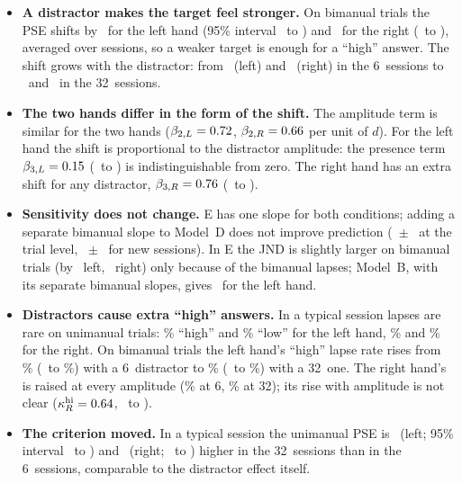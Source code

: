 \begin{itemize}
\item \textbf{A distractor makes the target feel stronger.} On bimanual trials the PSE shifts by \cnEShiftLeft\um\ for the left hand (95\% interval \cnEShiftLeftLo\ to \cnEShiftLeftHi) and \cnEShiftRight\um\ for the right (\cnEShiftRightLo\ to \cnEShiftRightHi), averaged over sessions, so a weaker target is enough for a ``high'' answer.
The shift grows with the distractor: from \cnEShiftSixLeft\ (left) and \cnEShiftSixRight\um\ (right) in the 6\um\ sessions to \cnEShiftThirtytwoLeft\ and \cnEShiftThirtytwoRight\um\ in the 32\um\ sessions.
\item \textbf{The two hands differ in the form of the shift.} The amplitude term is similar for the two hands ($\beta_{2,L}=0.72$, $\beta_{2,R}=0.66$ per unit of $d$).
For the left hand the shift is proportional to the distractor amplitude: the presence term $\beta_{3,L}=0.15$ (\cnEbthreeLeftLo\ to \cnEbthreeLeftHi) is indistinguishable from zero.
The right hand has an extra shift for any distractor, $\beta_{3,R}=0.76$ (\cnEbthreeRightLo\ to \cnEbthreeRightHi).
\item \textbf{Sensitivity does not change.} E has one slope for both conditions; adding a separate bimanual slope to Model~D does not improve prediction (\SvsDTrial\ $\pm$ \SvsDTrialSE\ at the trial level, \SvsDLoso\ $\pm$ \SvsDLosoSE\ for new sessions).
In E the JND is slightly larger on bimanual trials (by \cnEJndLeft\um\ left, \cnEJndRight\um\ right) only because of the bimanual lapses; Model~B, with its separate bimanual slopes, gives \cnBJndLeft\um\ for the left hand.
\item \textbf{Distractors cause extra ``high'' answers.} In a typical session lapses are rare on unimanual trials: \cnUniHiLeft\% ``high'' and \cnUniLoLeft\% ``low'' for the left hand, \cnUniHiRight\% and \cnUniLoRight\% for the right.
On bimanual trials the left hand's ``high'' lapse rate rises from \cnBiHiLeftSix\% (\cnBiHiLeftSixLo\ to \cnBiHiLeftSixHi\%) with a 6\um\ distractor to \cnBiHiLeftThirtytwo\% (\cnBiHiLeftThirtytwoLo\ to \cnBiHiLeftThirtytwoHi\%) with a 32\um\ one.
The right hand's is raised at every amplitude (\cnBiHiRightSix\% at 6\um, \cnBiHiRightThirtytwo\% at 32\um); its rise with amplitude is not clear ($\kappa^{\mathrm{hi}}_R=0.64$, \cnEkappaHiRightLo\ to \cnEkappaHiRightHi).
\item \textbf{The criterion moved.} In a typical session the unimanual PSE is \cnCritLeft\um\ (left; 95\% interval \cnCritLeftLo\ to \cnCritLeftHi) and \cnCritRight\um\ (right; \cnCritRightLo\ to \cnCritRightHi) higher in the 32\um\ sessions than in the 6\um\ sessions, comparable to the distractor effect itself.
\end{itemize}

